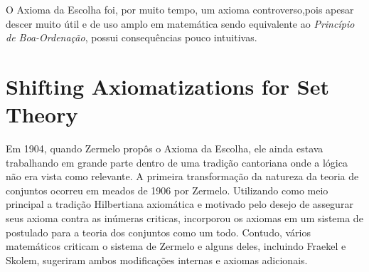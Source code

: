\documentclass[12pt,a4paper]{article}
\begin{document}
    O Axioma da Escolha foi, por muito tempo, um axioma controverso,pois apesar descer muito útil e de uso amplo em matemática sendo equivalente ao {\it Princípio de Boa-Ordenação}, possui consequências pouco intuitivas.
    
    \section{Shifting Axiomatizations for Set Theory}
    Em 1904, quando Zermelo propôs o Axioma da Escolha, ele ainda estava trabalhando em grande parte dentro de uma tradição cantoriana onde a lógica não era vista como relevante. A primeira transformação da natureza da teoria de conjuntos ocorreu em meados de 1906 por Zermelo. Utilizando como meio principal a tradição Hilbertiana axiomática e motivado pelo desejo de assegurar seus axioma contra as inúmeras criticas, incorporou os axiomas em um sistema de postulado para a teoria dos conjuntos como um todo. %
    Contudo, vários matemáticos criticam o sistema  de Zermelo e alguns deles, incluindo Fraekel e Skolem, sugeriram ambos modificações internas e axiomas adicionais.
    


    
    \newpage
    \printbibliography
  
\end{document}
